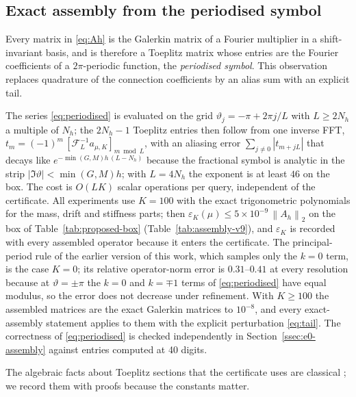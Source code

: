 \documentclass[11pt]{amsart}
\theoremstyle{remark}
\newcommand{\Ah}{A_h}
\newcommand{\norm}[1]{\left\lVert #1\right\rVert}
\newcommand{\sym}[1]{#1}                 %
\begin{document}
\subsection{Exact assembly from the periodised symbol}
\label{ssec:assembly}
Every matrix in \eqref{eq:Ah} is the Galerkin matrix of a Fourier multiplier in a shift-invariant
basis, and is therefore a Toeplitz matrix whose entries are the Fourier coefficients of a
$2\pi$-periodic function, the \emph{periodised symbol}.  This observation replaces quadrature of
the connection coefficients by an alias sum with an explicit tail.


The series \eqref{eq:periodised} is evaluated on the grid $\vartheta_j=-\pi+2\pi j/L$ with
$L\ge 2N_h$ a multiple of $N_h$; the $2N_h-1$ Toeplitz entries then follow from one inverse FFT,
$t_m=(-1)^m\,[\mathcal F_L^{-1}\sym{a}_{\mu,K}]_{m\bmod L}$, with an aliasing error
$\sum_{j\ne0}|t_{m+jL}|$ that decays like $e^{-\min(G,M)h\,(L-N_h)}$ because the fractional symbol is
analytic in the strip $|\Im\vartheta|<\min(G,M)h$; with $L=4N_h$ the exponent is at least $46$ on the
box.  The cost is $O(LK)$ scalar operations per query, independent of the certificate.
All experiments use $K=100$ with the exact trigonometric polynomials for the mass, drift and
stiffness parts; then $\varepsilon_K(\mu)\le5\times10^{-9}\,\norm{\Ah}_2$ on the box of
Table~\ref{tab:proposed-box} (Table~\ref{tab:assembly-v9}), and $\varepsilon_K$ is recorded with
every assembled operator because it enters the certificate.  The principal-period rule of the
earlier version of this work, which samples only the $k=0$ term, is the case $K=0$; its relative
operator-norm error is $0.31$--$0.41$ at every resolution because at $\vartheta=\pm\pi$ the $k=0$
and $k=\mp1$ terms of \eqref{eq:periodised} have equal modulus, so the error does not decrease
under refinement.  With $K\ge100$ the assembled matrices are the exact Galerkin matrices to
$10^{-8}$, and every exact-assembly statement applies to them with the explicit perturbation
\eqref{eq:tail}.  The correctness of \eqref{eq:periodised} is checked independently in
Section~\ref{ssec:e0-assembly} against entries computed at 40 digits.

The algebraic facts about Toeplitz sections that the certificate uses are classical
\cite{GrenanderSzego1958,BottcherSilbermann1999}; we record them with proofs because the
constants matter.

\end{document}
